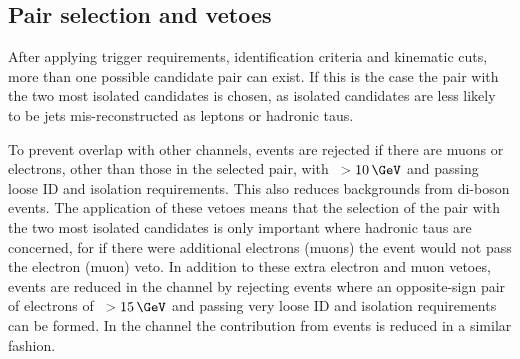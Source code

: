 \subsection{Pair selection and vetoes}
\label{sec:mssm_eventsel_pairs}
After applying trigger
requirements, identification criteria and kinematic cuts,
more than one possible candidate pair can exist. If
this is the case the pair with the two most isolated candidates
 is chosen, as isolated candidates are less likely 
to be jets mis-reconstructed
as leptons or hadronic taus.

To prevent overlap with other channels, events are rejected
if there are muons or electrons, other than those in the selected pair,
with \pT~$>10\,\GeV$ and passing loose ID and isolation requirements.
This also reduces backgrounds from di-boson events. The application
of these vetoes means that the selection of the pair with the
two most isolated candidates is only important where hadronic
taus are concerned, for if there were additional electrons (muons)
the event would not pass the electron (muon) veto.
In addition to these extra electron and muon vetoes, \Zee events are 
reduced in the \etau channel by rejecting events
where an opposite-sign pair of electrons of \pT~$>15\,\GeV$
and passing very loose ID and isolation requirements can be formed. 
In the \mutau channel the contribution from \Zmm events
is reduced in a similar fashion. 

